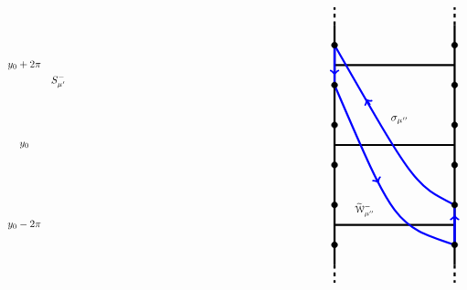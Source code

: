 \documentclass[11 pt]{article}
\renewcommand\({\left(}
\renewcommand\){\right)}
\newcommand\wt{\widetilde}
\newcommand\s{\sigma}
\newcommand\<{\langle}
\renewcommand\>{\rangle}
\newcommand\8{\infty}
\newcommand{\mc}{\mathcal}
\begin{document}
\begin{figure}[h]
\[\begin{tikzpicture}[scale = 0.55]
\draw (-13.8,5.2) node [scale = .8] {$S^-_{\mu'}$};


\draw (-15.5,2) node [scale = .8] {$y_0$};
\draw (-15.5,6) node [scale = .8] {$y_0 + 2\pi$};
\draw (-15.5,-2) node [scale = .8] {$y_0 - 2\pi$};




\draw[ultra thick] (-0,-4) -- (-0, 8);
\draw[ultra thick] (6,-4) -- (6,8);

\draw[ultra thick, dashed] (-0,8) -- (-0,8.9);
\draw[ultra thick, dashed] (6,8) -- (6,8.9);
\draw[ultra thick, dashed] (-0,-4) -- (-0,-4.9);
\draw[ultra thick, dashed] (6,-4) -- (6,-4.9);

\draw[ultra thick] (-0,-2) -- (6,-2);
\draw[ultra thick] (-0,2) -- (6,2);
\draw[ultra thick] (-0,6) -- (6,6);


\draw [ultra thick, blue] (0,5) .. controls (3,-2) .. (6,-3);
\draw[->, ultra thick, blue] (2.1,.3) -- (2.2,.1);

\draw[ultra thick, blue] (0,7) .. controls (4,0) .. (6,-1);
\draw[->, ultra thick, blue] (1.77,4.0) -- (1.57,4.3);

\draw[ultra thick, blue] (6,-1) -- (6,-3);
\draw[->, ultra thick, blue] (6,-3) -- (6,-1.5);

\draw[ultra thick, blue] (0,5) -- (0,7); 
\draw[->, ultra thick, blue] (0,7) -- (0,5.5);

\draw (1.5,-1.25) node [scale = .75] {$\wt{\mc{W}}^-_{\mu''}$};
\draw (3.25,3.25) node [scale = .85] {$\s_{\mu''}$};
 


\node [scale = .50] [circle, draw, fill = black] at (-0,-1)  {};
\node [scale = .50] [circle, draw, fill = black] at (-0,1)  {};
\node [scale = .50] [circle, draw, fill = black] at (6,-1)  {};
\node [scale = .50] [circle, draw, fill = black] at (6,1)  {};

\node [scale = .50] [circle, draw, fill = black] at (-0,7)  {};
\node [scale = .50] [circle, draw, fill = black] at (-0,-3)  {};
\node [scale = .50] [circle, draw, fill = black] at (6,7)  {};
\node [scale = .50] [circle, draw, fill = black] at (6,-3)  {};

\node [scale = .50] [circle, draw, fill = black] at (-0,3)  {};
\node [scale = .50] [circle, draw, fill = black] at (-0,5)  {};
\node [scale = .50] [circle, draw, fill = black] at (6,3)  {};
\node [scale = .50] [circle, draw, fill = black] at (6,5)  {};



\end{tikzpicture}\]
\end{figure}
\end{document}
